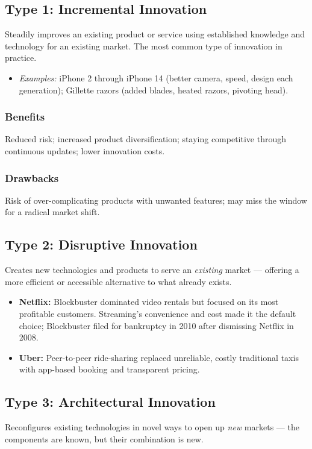 \documentclass[11pt, letterpaper]{article}
\begin{document}
\subsection{Type 1: Incremental Innovation}
Steadily improves an existing product or service using established knowledge and technology for an existing market. The most common type of innovation in practice.

\begin{itemize}[leftmargin=*]
  \item \textit{Examples:} iPhone 2 through iPhone 14 (better camera, speed, design each generation); Gillette razors (added blades, heated razors, pivoting head).
\end{itemize}

\subsubsection{Benefits}
Reduced risk; increased product diversification; staying competitive through continuous updates; lower innovation costs.

\subsubsection{Drawbacks}
Risk of over-complicating products with unwanted features; may miss the window for a radical market shift.

\subsection{Type 2: Disruptive Innovation}
Creates new technologies and products to serve an \textit{existing} market --- offering a more efficient or accessible alternative to what already exists.

\begin{itemize}[leftmargin=*]
  \item \textbf{Netflix:} Blockbuster dominated video rentals but focused on its most profitable customers. Streaming's convenience and cost made it the default choice; Blockbuster filed for bankruptcy in 2010 after dismissing Netflix in 2008.
  \item \textbf{Uber:} Peer-to-peer ride-sharing replaced unreliable, costly traditional taxis with app-based booking and transparent pricing.
\end{itemize}

\subsection{Type 3: Architectural Innovation}
Reconfigures existing technologies in novel ways to open up \textit{new} markets --- the components are known, but their combination is new.
\end{document}
